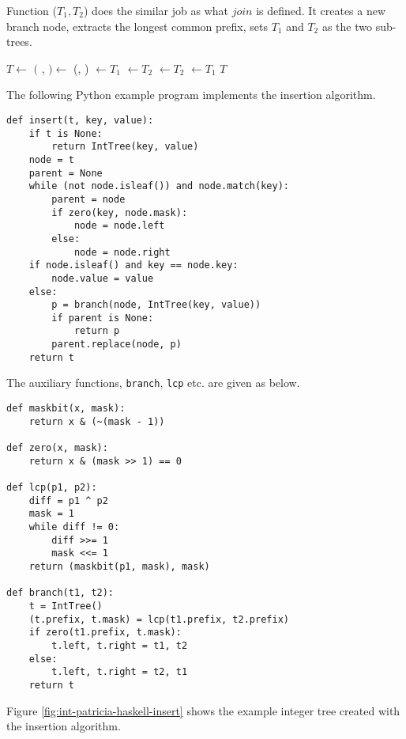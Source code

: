 \documentclass{article}
\begin{document}
Function ($T_1, T_2$) does the similar job as what $join$ is defined.
It creates a new branch node, extracts the longest common prefix, sets $T_1$ and
$T_2$ as the two sub-trees.

\begin{algorithmic}[1]
  \State $T \gets$ 
  \State $($ ,  $) \gets$ (, )
    \State {} $\gets T_1$
    \State {} $\gets T_2$
  \Else
    \State {} $\gets T_2$
    \State {} $\gets T_1$
  \EndIf
  \State \Return $T$
\EndFunction
\end{algorithmic}


The following Python example program implements the insertion algorithm.

\lstset{language=Python}
\begin{lstlisting}
def insert(t, key, value):
    if t is None:
        return IntTree(key, value)
    node = t
    parent = None
    while (not node.isleaf()) and node.match(key):
        parent = node
        if zero(key, node.mask):
            node = node.left
        else:
            node = node.right
    if node.isleaf() and key == node.key:
        node.value = value
    else:
        p = branch(node, IntTree(key, value))
        if parent is None:
            return p
        parent.replace(node, p)
    return t
\end{lstlisting}

The auxiliary functions, \texttt{branch}, \texttt{lcp} etc. are given as below.

\begin{lstlisting}
def maskbit(x, mask):
    return x & (~(mask - 1))

def zero(x, mask):
    return x & (mask >> 1) == 0

def lcp(p1, p2):
    diff = p1 ^ p2
    mask = 1
    while diff != 0:
        diff >>= 1
        mask <<= 1
    return (maskbit(p1, mask), mask)

def branch(t1, t2):
    t = IntTree()
    (t.prefix, t.mask) = lcp(t1.prefix, t2.prefix)
    if zero(t1.prefix, t.mask):
        t.left, t.right = t1, t2
    else:
        t.left, t.right = t2, t1
    return t
\end{lstlisting}

Figure \ref{fig:int-patricia-haskell-insert} shows the example integer tree created
with the insertion algorithm.
\end{document}
